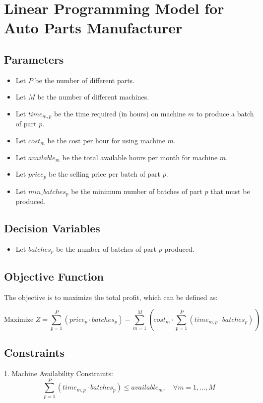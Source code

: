 \documentclass{article}
\begin{document}
\section*{Linear Programming Model for Auto Parts Manufacturer}

\subsection*{Parameters}
\begin{itemize}
    \item Let \( P \) be the number of different parts.
    \item Let \( M \) be the number of different machines.
    \item Let \( time_{m,p} \) be the time required (in hours) on machine \( m \) to produce a batch of part \( p \).
    \item Let \( cost_{m} \) be the cost per hour for using machine \( m \).
    \item Let \( available_{m} \) be the total available hours per month for machine \( m \).
    \item Let \( price_{p} \) be the selling price per batch of part \( p \).
    \item Let \( min\_batches_{p} \) be the minimum number of batches of part \( p \) that must be produced.
\end{itemize}

\subsection*{Decision Variables}
\begin{itemize}
    \item Let \( batches_{p} \) be the number of batches of part \( p \) produced.
\end{itemize}

\subsection*{Objective Function}
The objective is to maximize the total profit, which can be defined as:

\[
\text{Maximize } Z = \sum_{p=1}^{P} (price_{p} \cdot batches_{p}) - \sum_{m=1}^{M} (cost_{m} \cdot \sum_{p=1}^{P} (time_{m,p} \cdot batches_{p}))
\]

\subsection*{Constraints}
1. Machine Availability Constraints:
   \[
   \sum_{p=1}^{P} (time_{m,p} \cdot batches_{p}) \leq available_{m}, \quad \forall m = 1, \ldots, M
   \]
\end{document}
